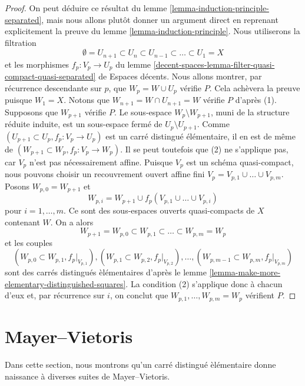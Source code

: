 \begin{proof}
On peut d\'eduire ce r\'esultat du
lemme \ref{lemma-induction-principle-separated}, mais nous allons plut\^ot
donner un argument direct en reprenant explicitement la preuve du
lemme \ref{lemma-induction-principle}. Nous utiliserons la filtration
$$
\emptyset = U_{n + 1} \subset
U_n \subset U_{n - 1} \subset \ldots \subset U_1 = X
$$
et les morphismes $f_p : V_p \to U_p$ du lemme
\ref{decent-spaces-lemma-filter-quasi-compact-quasi-separated} de
Espaces décents. Nous allons montrer, par r\'ecurrence descendante sur $p$,
que $W_p = W \cup U_p$ v\'erifie $P$. Cela ach\`evera la preuve puisque
$W_1 = X$. Notons que $W_{n + 1} = W \cap U_{n + 1} = W$ v\'erifie $P$
d'apr\`es (1). Supposons que $W_{p + 1}$ v\'erifie $P$. Le sous-espace
$W_p \setminus W_{p + 1}$, muni de la structure r\'eduite induite, est un
sous-espace ferm\'e de $U_p \setminus U_{p + 1}$.
Comme $(U_{p + 1} \subset U_p, f_p : V_p \to U_p)$ est un carr\'e distingu\'e
\'el\'ementaire, il en est de m\^eme de
$(W_{p + 1} \subset W_p, f_p : V_p \to W_p)$.
Il se peut toutefois que (2) ne s'applique pas, car $V_p$ n'est pas
n\'ecessairement affine. Puisque $V_p$ est un sch\'ema quasi-compact, nous
pouvons choisir un recouvrement ouvert affine fini
$V_p = V_{p, 1} \cup \ldots \cup V_{p, m}$. Posons
$W_{p, 0} = W_{p + 1}$ et
$$
W_{p, i} = W_{p + 1} \cup f_p(V_{p, 1} \cup \ldots \cup V_{p, i})
$$
pour $i = 1, \ldots, m$. Ce sont des sous-espaces ouverts quasi-compacts
de $X$ contenant $W$. On a alors
$$
W_{p + 1} = W_{p, 0} \subset
W_{p, 1} \subset \ldots \subset
W_{p, m} = W_p
$$
et les couples
$$
(W_{p, 0} \subset W_{p, 1}, f_p|_{V_{p, 1}}),
(W_{p, 1} \subset W_{p, 2}, f_p|_{V_{p, 2}}),\ldots,
(W_{p, m - 1} \subset W_{p, m}, f_p|_{V_{p, m}})
$$
sont des carr\'es distingu\'es \`el\'ementaires d'apr\`es le
lemme \ref{lemma-make-more-elementary-distinguished-squares}.
La condition (2) s'applique donc \`a chacun d'eux et, par r\'ecurrence sur
$i$, on conclut que $W_{p, 1}, \ldots, W_{p, m} = W_p$ v\'erifient $P$.
\end{proof}



\section{Mayer--Vietoris}
\label{section-mayer-vietoris}

\noindent
Dans cette section, nous montrons qu'un carr\'e distingu\'e \`el\'ementaire
donne naissance \`a diverses suites de Mayer--Vietoris.

